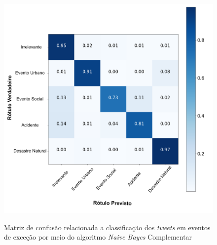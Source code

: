 \documentclass[
	12pt,				%
	oneside,			%
	a4paper,			%
	english,			%
	brazil				%
	]{abntex2ppgsi}
\begin{document}
{{\begin{apendicesenv}
\begin{figure}[!htb]
	\centering
 	  \caption{Matriz de confusão relacionada a classificação dos \textit{tweets} em eventos de exceção por meio do algoritmo \textit{Naive Bayes} Complementar}
		\includegraphics[width=1\linewidth]{images/confusion_matrix_cnb_pt.png}
	\label{fig:confusion_matrix_gnb}
\end{figure}


\end{apendicesenv}}}
\end{document}
